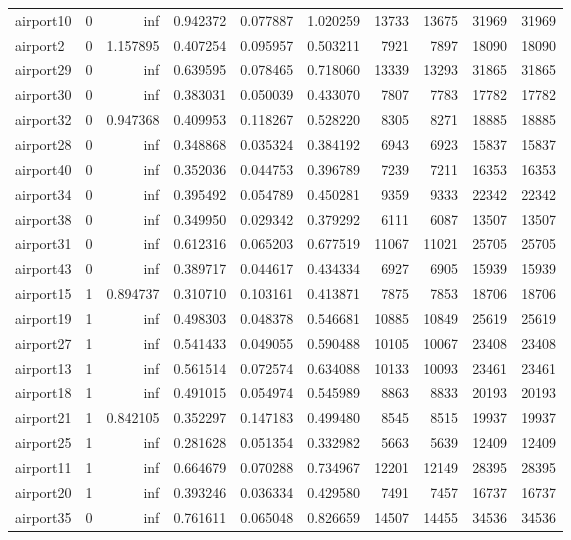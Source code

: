 \begin{longtable}{|l|r|r|r|r|r|r|r|r|r|}
airport10 & 0 & inf & 0.942372 & 0.077887 & 1.020259 & 13733 & 13675 & 31969 & 31969 \\
airport2 & 0 & 1.157895 & 0.407254 & 0.095957 & 0.503211 & 7921 & 7897 & 18090 & 18090 \\
airport29 & 0 & inf & 0.639595 & 0.078465 & 0.718060 & 13339 & 13293 & 31865 & 31865 \\
airport30 & 0 & inf & 0.383031 & 0.050039 & 0.433070 & 7807 & 7783 & 17782 & 17782 \\
airport32 & 0 & 0.947368 & 0.409953 & 0.118267 & 0.528220 & 8305 & 8271 & 18885 & 18885 \\
airport28 & 0 & inf & 0.348868 & 0.035324 & 0.384192 & 6943 & 6923 & 15837 & 15837 \\
airport40 & 0 & inf & 0.352036 & 0.044753 & 0.396789 & 7239 & 7211 & 16353 & 16353 \\
airport34 & 0 & inf & 0.395492 & 0.054789 & 0.450281 & 9359 & 9333 & 22342 & 22342 \\
airport38 & 0 & inf & 0.349950 & 0.029342 & 0.379292 & 6111 & 6087 & 13507 & 13507 \\
airport31 & 0 & inf & 0.612316 & 0.065203 & 0.677519 & 11067 & 11021 & 25705 & 25705 \\
airport43 & 0 & inf & 0.389717 & 0.044617 & 0.434334 & 6927 & 6905 & 15939 & 15939 \\
airport15 & 1 & 0.894737 & 0.310710 & 0.103161 & 0.413871 & 7875 & 7853 & 18706 & 18706 \\
airport19 & 1 & inf & 0.498303 & 0.048378 & 0.546681 & 10885 & 10849 & 25619 & 25619 \\
airport27 & 1 & inf & 0.541433 & 0.049055 & 0.590488 & 10105 & 10067 & 23408 & 23408 \\
airport13 & 1 & inf & 0.561514 & 0.072574 & 0.634088 & 10133 & 10093 & 23461 & 23461 \\
airport18 & 1 & inf & 0.491015 & 0.054974 & 0.545989 & 8863 & 8833 & 20193 & 20193 \\
airport21 & 1 & 0.842105 & 0.352297 & 0.147183 & 0.499480 & 8545 & 8515 & 19937 & 19937 \\
airport25 & 1 & inf & 0.281628 & 0.051354 & 0.332982 & 5663 & 5639 & 12409 & 12409 \\
airport11 & 1 & inf & 0.664679 & 0.070288 & 0.734967 & 12201 & 12149 & 28395 & 28395 \\
airport20 & 1 & inf & 0.393246 & 0.036334 & 0.429580 & 7491 & 7457 & 16737 & 16737 \\
airport35 & 0 & inf & 0.761611 & 0.065048 & 0.826659 & 14507 & 14455 & 34536 & 34536 \\

\end{longtable}
